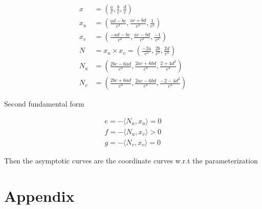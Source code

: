 \documentclass{article}
\begin{document}
\begin{align*}
    x &= \left(\frac{a}{c}, \frac{b}{c}, \frac{d}{c} \right) \\
    x_u &= \left(\frac{ad - bc}{c^2}, \frac{ac + bd}{c^2} , \frac{1}{c^2}\right) \\
    x_v &= \left(\frac{-ad -bc}{c^2}, \frac{ac - bd}{c^2}, \frac{-1}{c^2} \right) \\
    N &= x_u \times x_v = \left( \frac{-2a}{c^3}, \frac{2b}{c^3} , \frac{2d}{c^3}\right) \\
    N_u &= \left(\frac{2bc - 6ad}{c^4}, \frac{2ac + 6bd}{c^4}, \frac{2 + 4d^2}{c^4} \right) \\
    N_v &= \left(\frac{2bc + 6ad}{c^4}, \frac{2ac - 6bd}{c^4}, \frac{-2 - 4d^2}{c^4} \right)
\end{align*}

Second fundamental form

\begin{align*}
    e = - \langle N_u, x_u \rangle = 0 \\
    f = - \langle N_u, x_v \rangle > 0 \\ 
    g = - \langle N_v, x_v \rangle = 0
\end{align*}

Then the asymptotic curves are the coordinate curves w.r.t the parameterization





\section{Appendix}
\end{document}
